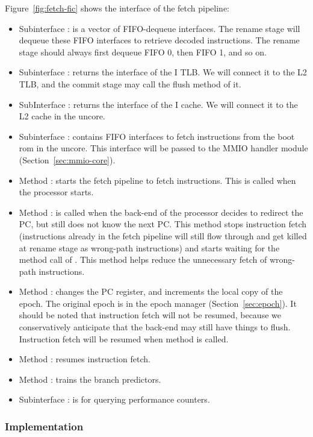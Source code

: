 Figure~\ref{fig:fetch-fic} shows the interface of the fetch pipeline:
\begin{itemize}
    \item Subinterface : is a vector of FIFO-dequeue interfaces.
    The rename stage will dequeue these FIFO interfaces to retrieve decoded instructions.
    The rename stage should always first dequeue FIFO 0, then FIFO 1, and so on.
    \item Subinterface : returns the interface of the I TLB.
    We will connect it to the L2 TLB, and the commit stage may call the flush method of it.
    \item SubInterface : returns the interface of the I cache.
    We will connect it to the L2 cache in the uncore.
    \item Subinterface : contains FIFO interfaces to fetch instructions from the boot rom in the uncore.
    This interface will be passed to the MMIO handler module (Section~\ref{sec:mmio-core}).
    \item Method : starts the fetch pipeline to fetch instructions.
    This is called when the processor starts.
    \item Method : is called when the back-end of the processor decides to redirect the PC, but still does not know the next PC.
    This method stops instruction fetch (instructions already in the fetch pipeline will still flow through and get killed at rename stage as wrong-path instructions) and starts waiting for the method call of .
    This method helps reduce the unnecessary fetch of wrong-path instructions.
    \item Method : changes the PC register, and increments the local copy of the epoch.
    The original epoch is in the epoch manager (Section~\ref{sec:epoch}).
    It should be noted that instruction fetch will not be resumed, because we conservatively anticipate that the back-end may still have things to flush.
    Instruction fetch will be resumed when method  is called.
    \item Method : resumes instruction fetch.
    \item Method : trains the branch predictors.
    \item Subinterface : is for querying performance counters.
\end{itemize}

\subsubsection{Implementation}

